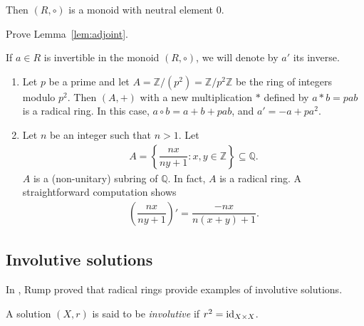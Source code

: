     \begin{lemma}\label{lem:adjoint}
        Then $(R,\circ)$ is a monoid with neutral element $0$. 
    \end{lemma}

    \begin{exercise}
        Prove Lemma~\ref{lem:adjoint}.
    \end{exercise}

    \begin{convention}
        If $a\in R$ is invertible in the monoid $(R, \circ)$, 
        we will denote by $a'$ its inverse.
    \end{convention}

    \begin{examples}\mbox{}
        \begin{enumerate}
            \item Let $p$ be a prime and let $A = \mathbb{Z}/(p^2) = \mathbb{Z}/p^2\mathbb{Z}$ be the ring of integers modulo $p^2$. Then $(A,+)$ with a new multiplication $\ast$ defined by $a\ast b = pab$ is a radical ring. In this case, $a\circ b = a+b+pab$, and $a' =-a+pa^2$. 
            \item Let $n$ be an integer such that $n>1$. Let 
                \begin{align*}
                    A=\left\{\dfrac{nx}{ny+1}\colon x,y \in \mathbb{Z}\right\}\subseteq \mathbb{Q}.
                \end{align*}
                $A$ is a (non-unitary) subring of $\mathbb{Q}$. In fact, $A$ is a radical ring. A straightforward computation shows
                \begin{align*}
                    \left(\dfrac{nx}{ny+1}\right)' = \dfrac{-nx}{n(x+y)+1}.
                \end{align*}
        \end{enumerate}
    \end{examples}

    \subsection{Involutive solutions}
    In \cite{MR2278047}, Rump proved that radical rings provide examples of involutive solutions.

    \begin{definition}
        A solution $(X,r)$ is said to be \emph{involutive} if $r^2=\operatorname{id}_{X\times X}$.
    \end{definition}
    
